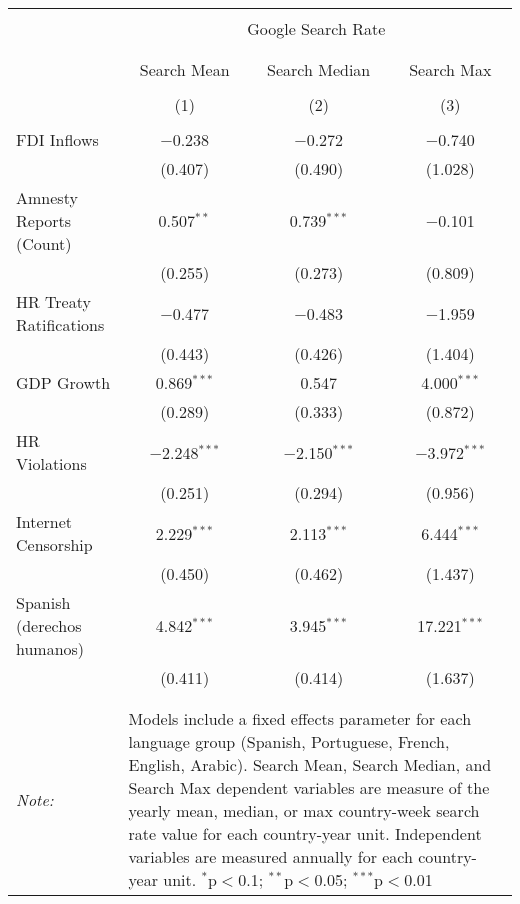
\begin{table}[!htbp] \centering 
  \caption{} 
  \label{} 
\begin{tabular}{@{\extracolsep{5pt}}lccc} 
\\[-1.8ex]\hline 
\hline \\[-1.8ex] 
 & \multicolumn{3}{c}{Google Search Rate} \\ 
\cline{2-4} 
\\[-1.8ex] & \multicolumn{3}{c}{ } \\ 
 & Search Mean & Search Median & Search Max \\ 
\\[-1.8ex] & (1) & (2) & (3)\\ 
\hline \\[-1.8ex] 
 FDI Inflows & $-$0.238 & $-$0.272 & $-$0.740 \\ 
  & (0.407) & (0.490) & (1.028) \\ 
  Amnesty Reports (Count) & 0.507$^{**}$ & 0.739$^{***}$ & $-$0.101 \\ 
  & (0.255) & (0.273) & (0.809) \\ 
  HR Treaty Ratifications & $-$0.477 & $-$0.483 & $-$1.959 \\ 
  & (0.443) & (0.426) & (1.404) \\ 
  GDP Growth & 0.869$^{***}$ & 0.547 & 4.000$^{***}$ \\ 
  & (0.289) & (0.333) & (0.872) \\ 
  HR Violations & $-$2.248$^{***}$ & $-$2.150$^{***}$ & $-$3.972$^{***}$ \\ 
  & (0.251) & (0.294) & (0.956) \\ 
  Internet Censorship & 2.229$^{***}$ & 2.113$^{***}$ & 6.444$^{***}$ \\ 
  & (0.450) & (0.462) & (1.437) \\ 
  Spanish (derechos humanos) & 4.842$^{***}$ & 3.945$^{***}$ & 17.221$^{***}$ \\ 
  & (0.411) & (0.414) & (1.637) \\ 
 \hline \\[-1.8ex] 
\hline 
\hline \\[-1.8ex] 
\textit{Note:}  & \multicolumn{3}{l}{\parbox[t]{8cm}{Models include a fixed effects parameter for each language group (Spanish, Portuguese, French, English, Arabic). Search Mean, Search Median, and Search Max dependent variables are measure of the yearly mean, median, or max country-week search rate value for each country-year unit. Independent variables are measured annually for each country-year unit. $^{*}$p$<$0.1; $^{**}$p$<$0.05; $^{***}$p$<$0.01}} \\ 
\end{tabular} 
\end{table} 
